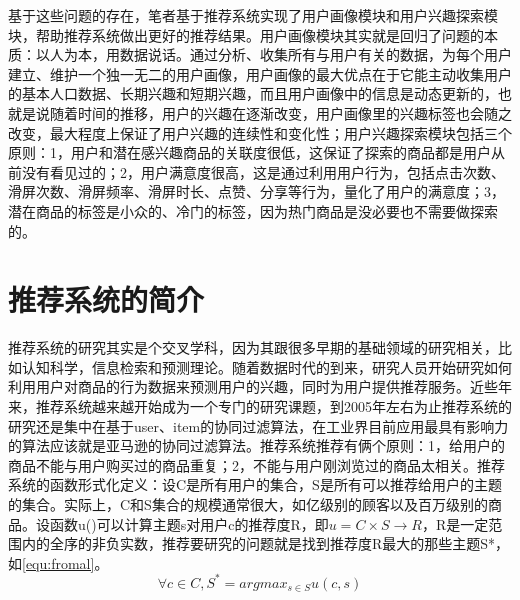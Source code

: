 	基于这些问题的存在，笔者基于推荐系统实现了用户画像模块和用户兴趣探索模块，帮助推荐系统做出更好的推荐结果。用户画像模块其实就是回归了问题的本质：以人为本，用数据说话。通过分析、收集所有与用户有关的数据，为每个用户建立、维护一个独一无二的用户画像，用户画像的最大优点在于它能主动收集用户的基本人口数据、长期兴趣和短期兴趣，而且用户画像中的信息是动态更新的，也就是说随着时间的推移，用户的兴趣在逐渐改变，用户画像里的兴趣标签也会随之改变，最大程度上保证了用户兴趣的连续性和变化性；用户兴趣探索模块包括三个原则：1，用户和潜在感兴趣商品的关联度很低，这保证了探索的商品都是用户从前没有看见过的；2，用户满意度很高，这是通过利用用户行为，包括点击次数、滑屏次数、滑屏频率、滑屏时长、点赞、分享等行为，量化了用户的满意度；3，潜在商品的标签是小众的、冷门的标签，因为热门商品是没必要也不需要做探索的。

\section{推荐系统的简介}
推荐系统的研究其实是个交叉学科，因为其跟很多早期的基础领域的研究相关，比如认知科学\citep{cognitive-science}，信息检索和预测理论\citep{Forecast-principle}。随着数据时代的到来，研究人员开始研究如何利用用户对商品的行为数据来预测用户的兴趣，同时为用户提供推荐服务\citep{cf-sn}。近些年来，推荐系统越来越开始成为一个专门的研究课题，到2005年左右为止推荐系统的研究还是集中在基于user、item的协同过滤算法\citep{Wikipedia}，在工业界目前应用最具有影响力的算法应该就是亚马逊的协同过滤算法\citep{Amazon-cf}。推荐系统推荐有俩个原则：1，给用户的商品不能与用户购买过的商品重复；2，不能与用户刚浏览过的商品太相关。推荐系统的函数形式化定义：设C是所有用户的集合，S是所有可以推荐给用户的主题的集合。实际上，C和S集合的规模通常很大，如亿级别的顾客以及百万级别的商品。设函数u()可以计算主题s对用户c的推荐度R，即$u=C\times S \rightarrow R$，R是一定范围内的全序的非负实数，推荐要研究的问题就是找到推荐度R最大的那些主题S*，如\autoref{equ:fromal}。
\begin{equation}
\forall c \in C,S^{*}=arg  max_{s \in S} u(c,s)
\label{equ:fromal}
\end{equation}

